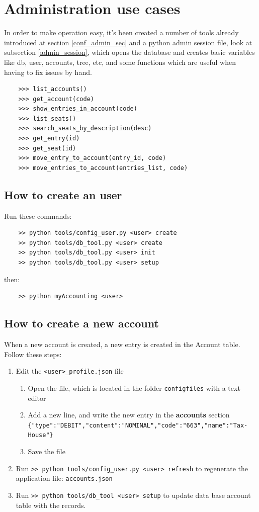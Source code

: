 \documentclass[12pt, a4paper]{article}
\begin{document}
\section{Administration use cases}
In order to make operation easy, it's been created a number of tools already introduced at section \ref{conf_admin_sec} and a python admin session file, look at subsection \ref{admin_session}, which opens the database and creates basic variables like db, user, accounts, tree, etc, and some functions which are useful when having to fix issues by hand.
\begin{verbatim}
	>>> list_accounts()
	>>> get_account(code)
	>>> show_entries_in_account(code)
	>>> list_seats()
	>>> search_seats_by_description(desc)
	>>> get_entry(id)
	>>> get_seat(id)
	>>> move_entry_to_account(entry_id, code)
	>>> move_entries_to_account(entries_list, code)
\end{verbatim}

\subsection{How to create an user}
Run these commands:
\begin{verbatim}
	>> python tools/config_user.py <user> create
	>> python tools/db_tool.py <user> create
	>> python tools/db_tool.py <user> init
	>> python tools/db_tool.py <user> setup
\end{verbatim}
then:
\begin{verbatim}
	>> python myAccounting <user>
\end{verbatim}
\subsection{How to create a new account}  
When a new account is created, a new entry is created in the Account table. 
Follow these steps:
\begin{enumerate}
	\item Edit the \verb!<user>_profile.json! file
	\begin{enumerate}
		\item Open the file, which is located in the folder \verb!configfiles! with a text editor
		\item Add a new line, and  write the new entry in the \textbf{accounts} section\\ 
		\verb!{"type":"DEBIT","content":"NOMINAL","code":"663","name":"Tax-House"}!
		\item Save the file
	\end{enumerate}
	\item Run \verb!>> python tools/config_user.py <user> refresh! to regenerate the application file: \verb!accounts.json!
	\item Run \verb!>> python tools/db_tool <user> setup! to  update data base account table with the records. 
\end{enumerate}
	
\end{document}
